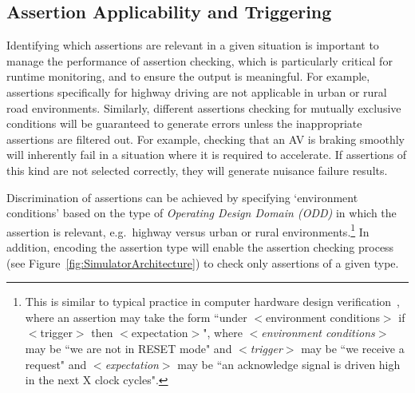 \subsection{Assertion Applicability and Triggering} \label{assertion_triggers}
Identifying which assertions are relevant in a given situation is important to manage the performance of assertion checking, which is  %
particularly critical for runtime monitoring, and to ensure the output is meaningful. For example, assertions specifically for highway driving are not applicable in urban or rural road environments. %
Similarly, different assertions checking for mutually exclusive conditions will be guaranteed to generate errors unless the inappropriate assertions are filtered out. For example, checking that an AV is braking smoothly will inherently fail in a situation where it is required to accelerate. If assertions of this kind are not selected correctly, they will generate nuisance failure results.


Discrimination %
of assertions can be achieved by specifying `environment conditions' based on the type of \textit{Operating Design Domain (ODD)} in which the assertion is relevant, e.g.\ highway versus urban or rural environments.\footnote{This is similar to typical practice in computer hardware design verification~\cite{tao2009}, where an assertion may take the form ``under $<$environment conditions$>$ if $<$trigger$>$ then $<$expectation$>$", where \textit{$<$environment conditions$>$} may be ``we are not in RESET mode" and \textit{$<$trigger$>$} may be ``we receive a request" and \textit{$<$expectation$>$}  may be ``an acknowledge signal is driven high in the next X clock cycles".} 
In addition, encoding the assertion type will enable the assertion checking process (see Figure~\ref{fig:SimulatorArchitecture}) to check only assertions of a given type.
%

